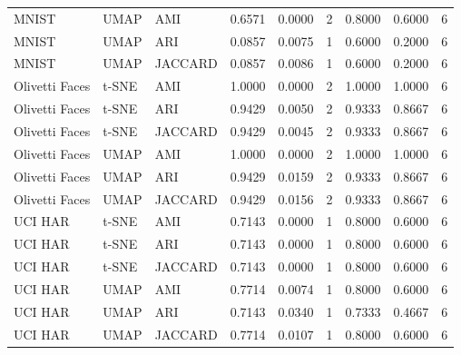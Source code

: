 \begin{tabular}{lllrrrrrr}
MNIST & UMAP & AMI & 0.6571 & 0.0000 & 2 & 0.8000 & 0.6000 & 6 \\
MNIST & UMAP & ARI & 0.0857 & 0.0075 & 1 & 0.6000 & 0.2000 & 6 \\
MNIST & UMAP & JACCARD & 0.0857 & 0.0086 & 1 & 0.6000 & 0.2000 & 6 \\
Olivetti Faces & t-SNE & AMI & 1.0000 & 0.0000 & 2 & 1.0000 & 1.0000 & 6 \\
Olivetti Faces & t-SNE & ARI & 0.9429 & 0.0050 & 2 & 0.9333 & 0.8667 & 6 \\
Olivetti Faces & t-SNE & JACCARD & 0.9429 & 0.0045 & 2 & 0.9333 & 0.8667 & 6 \\
Olivetti Faces & UMAP & AMI & 1.0000 & 0.0000 & 2 & 1.0000 & 1.0000 & 6 \\
Olivetti Faces & UMAP & ARI & 0.9429 & 0.0159 & 2 & 0.9333 & 0.8667 & 6 \\
Olivetti Faces & UMAP & JACCARD & 0.9429 & 0.0156 & 2 & 0.9333 & 0.8667 & 6 \\
UCI HAR & t-SNE & AMI & 0.7143 & 0.0000 & 1 & 0.8000 & 0.6000 & 6 \\
UCI HAR & t-SNE & ARI & 0.7143 & 0.0000 & 1 & 0.8000 & 0.6000 & 6 \\
UCI HAR & t-SNE & JACCARD & 0.7143 & 0.0000 & 1 & 0.8000 & 0.6000 & 6 \\
UCI HAR & UMAP & AMI & 0.7714 & 0.0074 & 1 & 0.8000 & 0.6000 & 6 \\
UCI HAR & UMAP & ARI & 0.7143 & 0.0340 & 1 & 0.7333 & 0.4667 & 6 \\
UCI HAR & UMAP & JACCARD & 0.7714 & 0.0107 & 1 & 0.8000 & 0.6000 & 6 \\
\bottomrule
\end{tabular}
